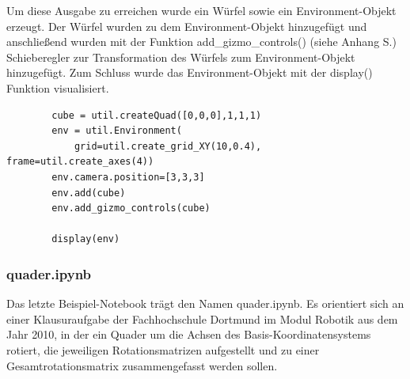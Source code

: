 Um diese Ausgabe zu erreichen wurde ein Würfel sowie ein Environment-Objekt erzeugt. Der Würfel wurden zu dem Environment-Objekt
hinzugefügt und anschließend wurden mit der Funktion add\_gizmo\_controls() (siehe Anhang S.\pageref{sec:add_gizmo_controls})
Schieberegler zur Transformation des Würfels zum Environment-Objekt
hinzugefügt. Zum Schluss wurde das Environment-Objekt mit der display() Funktion visualisiert.

\begin{center}
    \begin{verbatim}
        cube = util.createQuad([0,0,0],1,1,1)
        env = util.Environment(
            grid=util.create_grid_XY(10,0.4), frame=util.create_axes(4))
        env.camera.position=[3,3,3]
        env.add(cube)
        env.add_gizmo_controls(cube)
        
        display(env)
    \end{verbatim}
\end{center}


\subsubsection{quader.ipynb}
Das letzte Beispiel-Notebook trägt den Namen quader.ipynb.
Es orientiert sich an einer Klausuraufgabe der Fachhochschule Dortmund im Modul Robotik aus dem Jahr 2010,
in der ein Quader um die Achsen des Basis-Koordinatensystems rotiert,
die jeweiligen Rotationsmatrizen aufgestellt und zu einer Gesamtrotationsmatrix zusammengefasst werden sollen.

